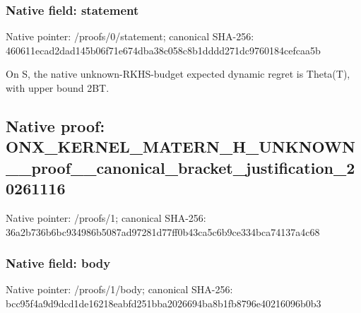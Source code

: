 \documentclass[10pt,a4paper]{article}
\begin{document}
\subsubsection{Native field: statement}
Native pointer: /proofs/0/statement; canonical SHA-256: 460611ecad2dad145b06f71e674dba38c058c8b1dddd271dc9760184cefcaa5b

\begingroup\raggedright\sloppy On S,\allowbreak{} the native unknown-RKHS-budget expected dynamic regret is Theta(T),\allowbreak{} with upper bound 2BT.\par\endgroup

\subsection{Native proof: ONX\_\allowbreak{}KERNEL\_\allowbreak{}MATERN\_\allowbreak{}H\_\allowbreak{}UNKNOWN\_\allowbreak{}\_\allowbreak{}proof\_\allowbreak{}\_\allowbreak{}canonical\_\allowbreak{}bracket\_\allowbreak{}justification\_\allowbreak{}20261116}
Native pointer: /proofs/1; canonical SHA-256: 36a2b736b6bc934986b5087ad97281d77ff0b43ca5c6b9ce334bca74137a4c68

\subsubsection{Native field: body}
Native pointer: /proofs/1/body; canonical SHA-256: bcc95f4a9d9dcd1de16218eabfd251bba2026694ba8b1fb8796e40216096b0b3
\end{document}
